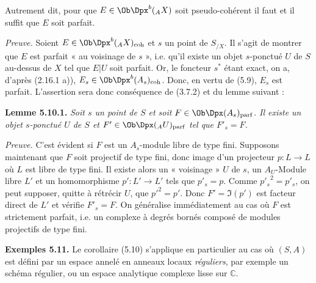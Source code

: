 Autrement dit, pour que \(E\in\Ob\Dpx^b({}_A X)\) soit pseudo-cohérent il faut et il suffit que \(E\) soit parfait.

\emph{Preuve.} Soient \(E\in\Ob\Dpx^b({}_A X)_{\mathrm{coh}}\) et \(s\) un point de \(S_{/X}\). Il s'agit de montrer que \(E\) est parfait « au voisinage de \(s\) », i.e. qu'il existe un objet \(s\)-ponctué \(U\) de \(S\) au-dessus de \(X\) tel que \(E|U\) soit parfait. Or, le foncteur \(s^*\) étant exact, on a, d'après (2.16.1 a)), \(E_s\in\Ob\Dpx^b(A_s)_{\mathrm{coh}}\). Donc, en vertu de (5.9), \(E_s\) est parfait. L'assertion sera donc conséquence de (3.7.2) et du lemme suivant :

\textbf{Lemme 5.10.1.} \emph{Soit \(s\) un point de \(S\) et soit \(F\in\Ob\Dpx(A_s)_{\mathrm{parf}}\). Il existe un objet \(s\)-ponctué \(U\) de \(S\) et \(F'\in\Ob\Dpx({}_A U)_{\mathrm{parf}}\) tel que \(F'_s=F\).}

\emph{Preuve.} C'est évident si \(F\) est un \(A_s\)-module libre de type fini. Supposons maintenant que \(F\) soit projectif de type fini, donc image d'un projecteur \(p:L\longrightarrow L\) où \(L\) est libre de type fini. Il existe alors un « voisinage » \(U\) de \(s\), un \(A_U\)-Module libre \(L'\) et un homomorphisme \(p':L'\to L'\) tels que \(p'_s=p\). Comme \({p'_s}^2=p'_s\), on peut supposer, quitte à rétrécir \(U\), que \(p'^2=p'\). Donc \(F'=\Im(p')\) est facteur direct de \(L'\) et vérifie \(F'_s=F\). On généralise immédiatement au cas où \(F\) est strictement parfait, i.e. un complexe à degrés bornés composé de modules projectifs de type fini.

\textbf{Exemples 5.11.} Le corollaire (5.10) s'applique en particulier au cas où \((S,A)\) est défini par un espace annelé en anneaux locaux \emph{réguliers}, par exemple un schéma régulier, ou un espace analytique complexe lisse sur \(\mathbb C\).

